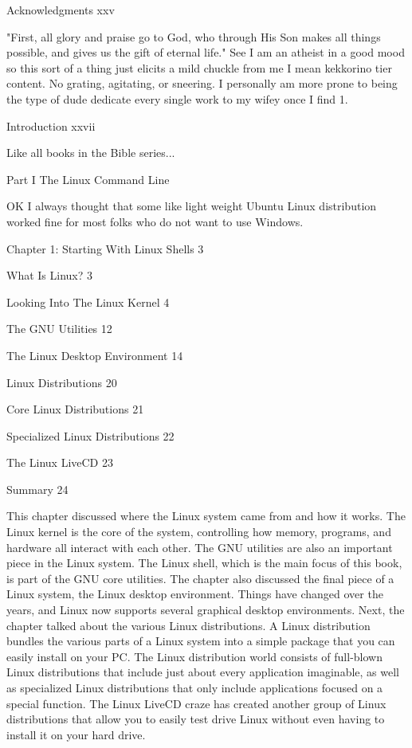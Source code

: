 Acknowledgments xxv

"First, all glory and praise go to God, who through His Son makes all things possible, and gives us the gift of eternal life." See I am an atheist in a good mood so this sort of a thing just elicits a mild chuckle from me I mean kekkorino tier content. No grating, agitating, or sneering. I personally am more prone to being the type of dude dedicate every single work to my wifey once I find 1.

Introduction xxvii

Like all books in the Bible series...

Part I The Linux Command Line

OK I always thought that some like light weight Ubuntu Linux distribution worked fine for most folks who do not want to use Windows.

Chapter 1: Starting With Linux Shells 3



What Is Linux? 3



Looking Into The Linux Kernel 4



The GNU Utilities 12



The Linux Desktop Environment 14



Linux Distributions 20



Core Linux Distributions 21



Specialized Linux Distributions 22



The Linux LiveCD 23



Summary 24

This chapter discussed where the Linux system came from and how it works. The Linux kernel is the core of the system, controlling how memory, programs, and hardware all interact with each other. The GNU utilities are also an important piece in the Linux system. The Linux shell, which is the main focus of this book, is part of the GNU core utilities. The chapter also discussed the final piece of a Linux system, the Linux desktop environment. Things have changed over the years, and Linux now supports several graphical desktop environments. Next, the chapter talked about the various Linux distributions. A Linux distribution bundles the various parts of a Linux system into a simple package that you can easily install on your PC. The Linux distribution world consists of full-blown Linux distributions that include just about every application imaginable, as well as specialized Linux distributions that only include applications focused on a special function. The Linux LiveCD craze has created another group of Linux distributions that allow you to easily test drive Linux without even having to install it on your hard drive.

